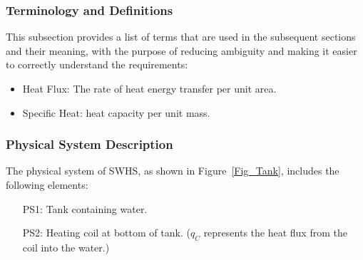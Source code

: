 \documentclass[12pt]{article}
\newcommand{\progname}{SWHS}
\begin{document}

\subsubsection{Terminology and  Definitions}

This subsection provides a list of terms that are used in the subsequent
sections and their meaning, with the purpose of reducing ambiguity and making it
easier to correctly understand the requirements:

\begin{itemize}

\item Heat Flux: The rate of heat energy transfer per unit area.


\item Specific Heat: heat capacity per unit mass.



\end{itemize}

\subsubsection{Physical System Description}

The physical system of \progname{}, as shown in Figure~\ref{Fig_Tank},
includes the following elements:

\begin{itemize}

\item[PS1:] Tank containing water.

\item[PS2:] Heating coil at bottom of tank.  ($q_C$ represents the heat flux
  from the coil into the water.)


\end{itemize}
\end{document}
